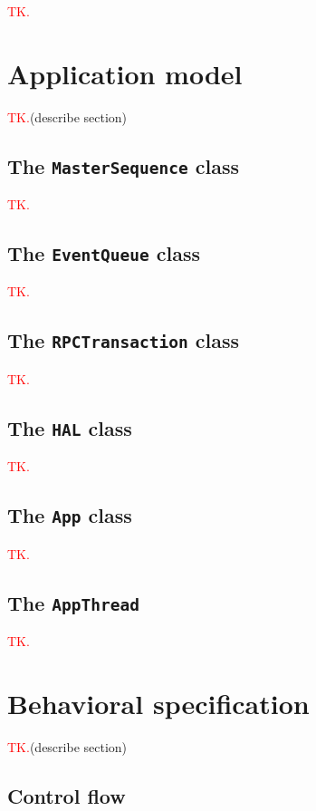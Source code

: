 \documentclass[11pt, oneside]{article}
\newcommand{\todo}{\textcolor{red}{TK.}}
\begin{document}
                \todo

    \section{Application model} \label{amodel}

        \todo (describe section)

        \subsection{The \texttt{MasterSequence} class}

            \todo

        \subsection{The \texttt{EventQueue} class}

            \todo

        \subsection{The \texttt{RPCTransaction} class}

            \todo

        \subsection{The \texttt{HAL} class}

            \todo

        \subsection{The \texttt{App} class}
        
            \todo

        \subsection{The \texttt{AppThread}}

            \todo

    \section{Behavioral specification} \label{behavior}

        \todo (describe section)

        \subsection{Control flow}
\end{document}
